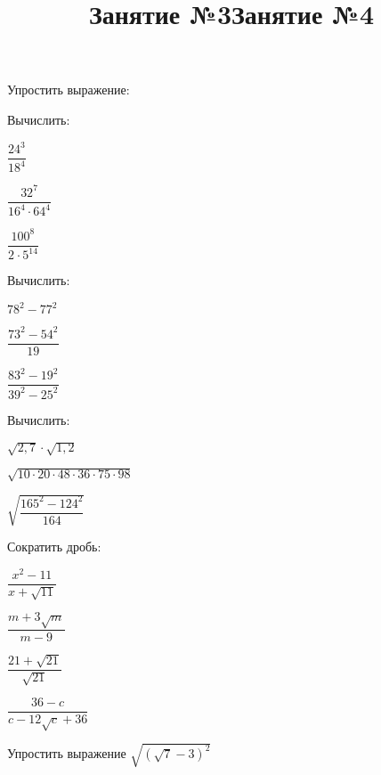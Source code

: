\title{Занятие №3}
\begin{listofex}
	\item Упростить выражение:
	\begin{enumcols}[itemcolumns=1]
		\item {}
		\item {}
	\end{enumcols}
	\item Вычислить:
	\begin{enumcols}[itemcolumns=3]
		\item \( \dfrac{24^3}{18^4} \)
		\item \( \dfrac{32^7}{16^4\cdot64^4} \)
		\item \( \dfrac{100^8}{2^{}\cdot5^{14}} \)
	\end{enumcols}
	\item Вычислить:
	\begin{enumcols}[itemcolumns=3]
		\item \( 78^2-77^2 \)
		\item \( \dfrac{73^2-54^2}{19} \)
		\item \( \dfrac{83^2-19^2}{39^2-25^2} \)
	\end{enumcols}
	\item Вычислить:
	\begin{enumcols}[itemcolumns=3]
		\item \( \sqrt{2,7}\cdot\sqrt{1,2} \)
		\item \( \sqrt{10\cdot20\cdot48\cdot36\cdot75\cdot98} \)
		\item \( \sqrt{\dfrac{165^2-124^2}{164}} \)
	\end{enumcols}
	\item Сократить дробь:
	\begin{enumcols}[itemcolumns=2]
		\item \( \dfrac{x^2-11}{x+\sqrt{11}} \)
		\item \( \dfrac{m+3\sqrt{m}}{m-9} \)
		\item \( \dfrac{21+\sqrt{21}}{\sqrt{21}} \)
		\item \( \dfrac{36-c}{c-12\sqrt{c}+36} \)
	\end{enumcols}
	\item Упростить выражение \( \sqrt{(\sqrt{7}-3)^2} \)
\end{listofex}
\newpage
\title{Занятие №4}
